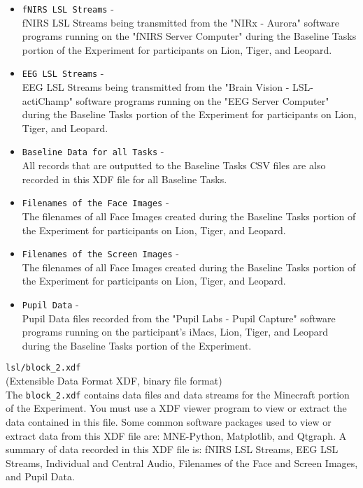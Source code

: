 \begin{description}
\begin{addmargin}[0em]{0em}
    \begin{itemize}
        \item \verb|fNIRS LSL Streams| -\\
        fNIRS LSL Streams being transmitted from the "NIRx - Aurora" software
        programs running on the "fNIRS Server Computer" during the Baseline
        Tasks portion of the Experiment for participants on Lion, Tiger, and
        Leopard.
        \item \verb|EEG LSL Streams| -\\
        EEG LSL Streams being transmitted from the "Brain Vision -
        LSL-actiChamp" software programs running on the "EEG Server Computer"
        during the Baseline Tasks portion of the Experiment for participants on
        Lion, Tiger, and Leopard.
        \item \verb|Baseline Data for all Tasks| -\\
        All records that are outputted to the Baseline Tasks CSV files are also
        recorded in this XDF file for all Baseline Tasks.
        \item \verb|Filenames of the Face Images| -\\
        The filenames of all Face Images created during the Baseline Tasks
        portion of the Experiment for participants on Lion, Tiger, and Leopard.
        \item \verb|Filenames of the Screen Images| -\\
        The filenames of all Face Images created during the Baseline Tasks
        portion of the Experiment for participants on Lion, Tiger, and Leopard.
        \item \verb|Pupil Data| -\\
        Pupil Data files recorded from the "Pupil Labs - Pupil Capture"
        software programs running on the participant's iMacs, Lion, Tiger, and
        Leopard during the Baseline Tasks portion of the Experiment.
    \end{itemize}


    \medskip
    \item\verb|lsl/block_2.xdf|\\(Extensible Data Format XDF, binary file format)\\
    The \verb|block_2.xdf| contains data files and data streams for the Minecraft portion of the Experiment. You must use a XDF viewer program to view or extract the data contained in this file. Some common software packages used to view or extract data from this XDF file are: MNE-Python, Matplotlib, and Qtgraph. A summary of data recorded in this XDF file is: fNIRS LSL Streams, EEG LSL Streams, Individual and Central Audio, Filenames of the Face and Screen Images, and Pupil Data.


\end{addmargin}
\end{description}
